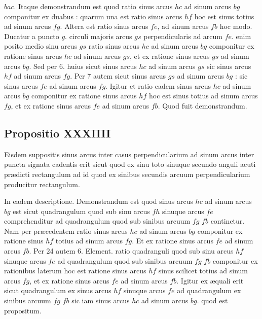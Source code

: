 \documentclass[11pt,a4paper]{article}
\begin{document}
$bac$. Itaque demonstrandum est quod ratio sinus arcus $hc$ ad sinum arcus $bg$ componitur ex duabus : quarum una est ratio sinus arcus $hf$ hoc est sinus totius ad sinum arcus $fg$. Altera est ratio sinus arcus $fe$, ad sinum arcus $fb$ hoc modo. Ducatur a puncto $g$. circuli majoris arcus $gs$ perpendicularis ad arcum $fe$.  enim posito medio sinu arcus $gs$ ratio sinus arcus $hc$ ad sinum arcus $bg$ componitur ex ratione sinus arcus $hc$ ad sinum arcus $gs$, et ex ratione sinus arcus $gs$ ad sinum arcus $bg$. Sed per 6. huius sicut sinus arcus $hc$ ad sinum arcus $gs$ sic sinus arcus $hf$ ad sinum arcus $fg$. Per 7 autem sicut sinus arcus $gs$ ad sinum arcus $bg$ : sic sinus arcus $fe$ ad sinum arcus $fg$. Igitur et ratio eadem sinus arcus $hc$ ad sinum arcus $bg$ componitur ex ratione sinus arcus $hf$ hoc est sinus totius ad sinum arcus $fg$, et ex ratione sinus arcus $fe$ ad sinum arcus $fb$. Quod fuit demonstrandum.

\subsection*{Propositio XXXIIII}

Eisdem suppositis sinus arcus inter casus perpendicularium ad sinum arcus inter puncta signata cadentis erit sicut quod ex sinu toto sinuque secundo anguli acuti prædicti rectangulum ad id quod ex sinibus secundis arcuum perpendicularium producitur rectangulum.

In eadem descriptione. Demonstrandum est quod sinus arcus $hc$ ad sinum arcus $bg$ est sicut quadrangulum quod sub sinu arcus $fh$ sinuque arcus $fe$ comprehenditur ad quadrangulum quod sub sinibus arcuum $fg$ $fb$ continetur. Nam per præcedentem ratio sinus arcus $hc$ ad sinum arcus $bg$ componitur ex ratione sinus $hf$ totius ad sinum arcus $fg$. Et ex ratione sinus arcus $fe$ ad sinum arcus $fb$. Per 24 autem 6. Element. ratio quadranguli quod sub sinu arcus $hf$ sinuque arcus $fe$ ad quadrangulum quod sub sinibus arcuum $fg$ $fb$ componitur ex rationibus laterum hoc est ratione sinus arcus $hf$ sinus scilicet totius ad sinum arcus $fg$, et ex ratione sinus arcus $fe$ ad sinum arcus $fb$. Igitur ex æquali erit sicut quadrangulum ex sinus arcus $hf$ sinuque arcus $fe$ ad quadrangulum ex sinibus arcuum $fg$ $fb$ sic iam sinus arcus $hc$ ad sinum arcus $bg$. quod est propositum.
\end{document}
